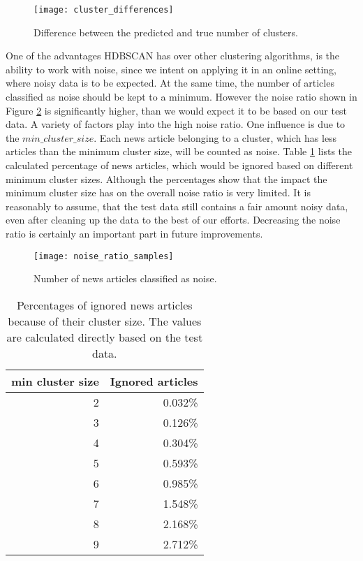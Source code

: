 \begin{figure}[h]
    \centering
    \texttt{[image: cluster\_differences]}
    \caption{Difference between the predicted and true number of clusters.}
    \label{fig:cluster_differences}
\end{figure}

One of the advantages HDBSCAN has over other clustering algorithms, is the ability to work with noise, since we intent on applying it in an online setting, where noisy data is to be expected. At the same time, the number of articles classified as noise should be kept to a minimum. However the noise ratio shown in Figure \ref{fig:noise_ratio_samples} is significantly higher, than we would expect it to be based on our test data. A variety of factors play into the high noise ratio. One influence is due to the $min\_cluster\_size$. Each news article belonging to a cluster, which has less articles than the minimum cluster size, will be counted as noise. Table \ref{tab:expected_noise} lists the calculated percentage of news articles, which would be ignored based on different minimum cluster sizes. Although the percentages show that the impact the minimum cluster size has on the overall noise ratio is very limited. It is reasonably to assume, that the test data still contains a fair amount noisy data, even after cleaning up the data to the best of our efforts. Decreasing the noise ratio is certainly an important part in future improvements.

\begin{figure}[h]
    \centering
    \texttt{[image: noise\_ratio\_samples]}
    \caption{Number of news articles classified as noise.}
    \label{fig:noise_ratio_samples}
\end{figure}

\begin{table}[h]
    \centering
    \begin{tabular}{|r|r|}
        \hline
        \textbf{min cluster size} & \textbf{Ignored articles} \\
        \hline
        2 & 0.032\% \\ \hline
        3 & 0.126\% \\ \hline
        4 & 0.304\% \\ \hline
        5 & 0.593\% \\ \hline
        6 & 0.985\% \\ \hline
        7 & 1.548\% \\ \hline
        8 & 2.168\% \\ \hline
        9 & 2.712\% \\ \hline
    \end{tabular}
    \caption{Percentages of ignored news articles because of their cluster size. The values are calculated directly based on the test data.}
    \label{tab:expected_noise}
\end{table}

